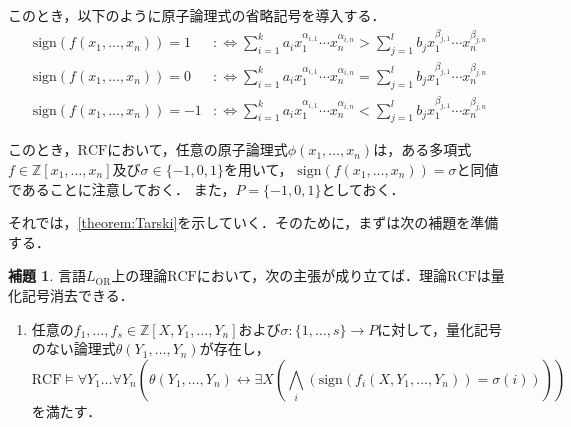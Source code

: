 \documentclass[uplatex, dvipdfmx]{jsarticle}
\numberwithin{equation}{section}
\newcommand{\Z}{\mathbb{Z}}
\newcommand{\defiff}{ :\Leftrightarrow}
\newcommand{\RCF}{\mathrm{RCF}}
\newcommand{\sign}{\mathrm{sign}}
\newcommand{\map}[3]{{#1}\colon{#2}\rightarrow{#3}}
\theoremstyle{definition}
\newtheorem{lemma}[definition]{補題}
\begin{document}
このとき，以下のように原子論理式の省略記号を導入する．
\begin{align}
     \sign (f(x_1, \dots, x_n)) = 1 &\defiff \sum_{i=1}^k a_i x_1^{\alpha_{i,1}} \cdots x_n^{\alpha_{i,n}} > \sum_{j=1}^l b_j x_1^{\beta_{j,1}} \cdots x_n^{\beta_{j,n}}\\
     \sign (f(x_1, \dots, x_n)) = 0 &\defiff \sum_{i=1}^k a_i x_1^{\alpha_{i,1}} \cdots x_n^{\alpha_{i,n}} = \sum_{j=1}^l b_j x_1^{\beta_{j,1}} \cdots x_n^{\beta_{j,n}}\\
     \sign (f(x_1, \dots, x_n)) = -1 &\defiff \sum_{i=1}^k a_i x_1^{\alpha_{i,1}} \cdots x_n^{\alpha_{i,n}} < \sum_{j=1}^l b_j x_1^{\beta_{j,1}} \cdots x_n^{\beta_{j,n}}
\end{align}

このとき，$\RCF$において，任意の原子論理式$\phi(x_1, \dots, x_n)$は，ある多項式$f \in \Z[x_1, \dots, x_n]$及び$\sigma \in \{-1, 0, 1\}$を用いて，
$\sign(f(x_1, \dots, x_n)) = \sigma$と同値であることに注意しておく．
また，$P = \{-1, 0, 1\}$としておく．

それでは，\cref{theorem:Tarski}を示していく．そのために，まずは次の補題を準備する．

\begin{lemma}\label{lemma:qe_simplify}
     言語$L_\mathrm{OR}$上の理論$\RCF$において，次の主張が成り立てば．理論$\RCF$は量化記号消去できる．

     \begin{enumerate}
          \item \label{qe_1}
          任意の$f_1, \dots, f_s \in \Z[X, Y_1, \dots, Y_n]$および$\map{\sigma}{\{1,\dots, s\}}{P}$に対して，量化記号のない論理式$\theta(Y_1, \dots, Y_n)$が存在し，
          \begin{equation}
               \RCF \models \forall Y_1 \dots \forall Y_n ( \theta(Y_1, \dots, Y_n) \leftrightarrow \exists X(\bigwedge_i (\sign(f_i(X,Y_1, \dots, Y_n))= \sigma(i))) )
          \end{equation}
          を満たす．
     \end{enumerate}
\end{lemma}
\end{document}
